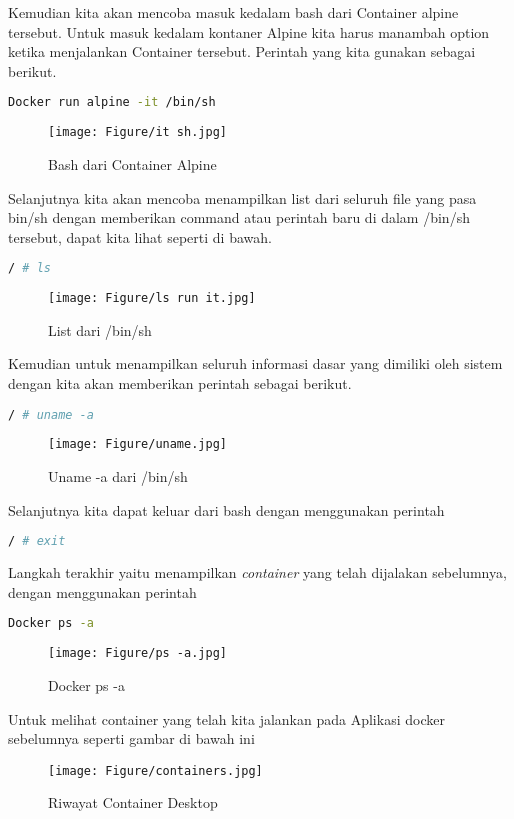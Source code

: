 \documentclass[11pt,a4paper]{article}
\begin{document}
\newpage
Kemudian kita akan mencoba masuk kedalam bash dari Container alpine tersebut. Untuk masuk kedalam kontaner Alpine kita harus manambah option ketika menjalankan Container tersebut. Perintah yang kita gunakan sebagai berikut.
\begin{lstlisting}[language = bash]
	Docker run alpine -it /bin/sh 
\end{lstlisting}
\begin{figure}[h]
	\centering
	\texttt{[image: Figure/it sh.jpg]}
	\caption{Bash dari Container Alpine}
\end{figure}
Selanjutnya kita akan mencoba menampilkan list dari seluruh file yang pasa bin/sh dengan memberikan command atau perintah baru di dalam /bin/sh tersebut, dapat kita lihat seperti di bawah.
\begin{lstlisting}[language = bash]
	/ # ls
\end{lstlisting}
\begin{figure}[h]
	\centering
	\texttt{[image: Figure/ls run it.jpg]}
	\caption{List dari /bin/sh}
\end{figure}
Kemudian untuk menampilkan seluruh informasi dasar yang dimiliki oleh sistem dengan kita akan memberikan perintah sebagai berikut.
\begin{lstlisting}[language = bash]
	/ # uname -a
\end{lstlisting}
\begin{figure}[h]
	\centering
	\texttt{[image: Figure/uname.jpg]}
	\caption{Uname -a dari /bin/sh}
\end{figure}
Selanjutnya kita dapat keluar dari bash dengan menggunakan perintah
\begin{lstlisting}[language = bash]
	/ # exit
\end{lstlisting}
Langkah terakhir yaitu menampilkan \textit{container} yang telah dijalakan sebelumnya, dengan menggunakan perintah
\begin{lstlisting}[language = bash]
	Docker ps -a
\end{lstlisting}
\begin{figure}[h]
	\centering
	\texttt{[image: Figure/ps -a.jpg]}
	\caption{Docker ps -a}
\end{figure}
\newpage
Untuk melihat container yang telah kita jalankan pada Aplikasi docker sebelumnya seperti gambar di bawah ini
\begin{figure}[h]
	\centering
	\texttt{[image: Figure/containers.jpg]}
	\caption{Riwayat Container Desktop}
\end{figure}
\end{document}
